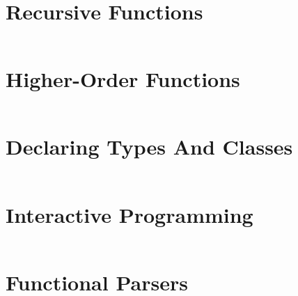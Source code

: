 \documentclass[a4paper,9pt,twoside]{book}
\newcommand{\hsfile}[1]{\inputminted[breaklines]{haskell}{../haskell/#1.hs}}
\begin{document}
\section{Recursive Functions}
\hsfile{slides/5_recursive_functions}
\section{Higher-Order Functions}
\hsfile{slides/6_higher-order_functions}
\section{Declaring Types And Classes}
\hsfile{slides/7_declaring_types_and_classes}
\section{Interactive Programming}
\hsfile{slides/8_interactive_programming}
\section{Functional Parsers}
\hsfile{slides/9_functional_parsers}
\end{document}
